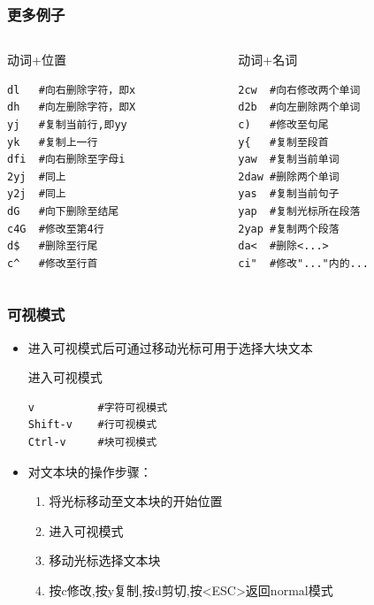 \documentclass[xcolor=svgnames,presentation]{beamer}
\begin{document}
\begin{frame}[fragile]
\frametitle{更多例子}
\label{sec-4-4-6}
\begin{columns}
\begin{column}{0.5\textwidth}
\begin{exampleblock}{动词+位置}
\label{sec-4-4-6-1}


\begin{verbatim}
dl   #向右删除字符，即x
dh   #向左删除字符，即X
yj   #复制当前行,即yy
yk   #复制上一行
dfi  #向右删除至字母i
2yj  #同上
y2j  #同上
dG   #向下删除至结尾
c4G  #修改至第4行
d$   #删除至行尾
c^   #修改至行首
\end{verbatim}
\end{exampleblock}
\end{column}
\begin{column}{0.5\textwidth}
\begin{block}{动词+名词}
\label{sec-4-4-6-2}


\begin{verbatim}
2cw  #向右修改两个单词
d2b  #向左删除两个单词
c)   #修改至句尾
y{   #复制至段首
yaw  #复制当前单词
2daw #删除两个单词
yas  #复制当前句子
yap  #复制光标所在段落
2yap #复制两个段落
da<  #删除<...>
ci"  #修改"..."内的...
\end{verbatim}
\end{block}
\end{column}
\end{columns}
\end{frame}
\begin{frame}[fragile]
\frametitle{可视模式}
\label{sec-4-4-7}
\begin{itemize}

\item 进入可视模式后可通过移动光标可用于选择大块文本
\label{sec-4-4-7-1}%
\begin{exampleblock}{进入可视模式}
\label{sec-4-4-7-1-1}


\begin{verbatim}
v          #字符可视模式
Shift-v    #行可视模式
Ctrl-v     #块可视模式
\end{verbatim}
\end{exampleblock}

\item 对文本块的操作步骤：
\label{sec-4-4-7-2}%
\begin{enumerate}
\item 将光标移动至文本块的开始位置
\item 进入可视模式
\item 移动光标选择文本块
\item 按c修改,按y复制,按d剪切,按<ESC>返回normal模式
\end{enumerate}
\end{itemize} %
\end{frame}
\end{document}
